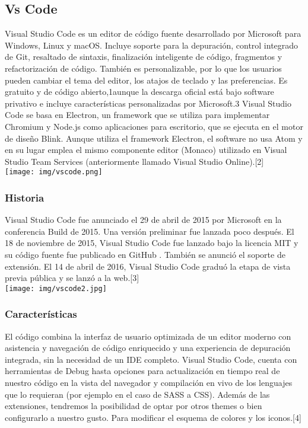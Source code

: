 \documentclass[twocolumn]{article}
\begin{document}
\subsection{Vs Code}
Visual Studio Code es un editor de código fuente desarrollado por Microsoft para Windows, Linux 
y macOS. Incluye soporte para la depuración, control integrado de Git, resaltado de sintaxis, 
finalización inteligente de código, fragmentos y refactorización de código. También es personalizable, 
por lo que los usuarios pueden cambiar el tema del editor, los atajos de teclado y las preferencias. Es 
gratuito y de código abierto,1aunque la descarga oficial está bajo software privativo e incluye características 
personalizadas por Microsoft.3
Visual Studio Code se basa en Electron, un framework que se utiliza para implementar Chromium y Node.js como 
aplicaciones para escritorio, que se ejecuta en el motor de diseño Blink. Aunque utiliza el framework Electron, 
el software no usa Atom y en su lugar emplea el mismo componente editor (Monaco) utilizado en Visual Studio Team 
Services (anteriormente llamado Visual Studio Online).[2]\\
\texttt{[image: img/vscode.png]}
\subsubsection{Historia}

Visual Studio Code fue anunciado el 29 de abril de 2015 por Microsoft en la conferencia Build de 2015. 
Una versión preliminar fue lanzada poco después. El 18 de noviembre de 2015, Visual Studio Code fue lanzado 
bajo la licencia MIT y su código fuente fue publicado en GitHub . También se anunció el soporte de extensión. 
El 14 de abril de 2016, Visual Studio Code graduó la etapa de vista previa pública y se lanzó a la web.[3]\\
\texttt{[image: img/vscode2.jpg]}

\subsubsection{Características}

El código combina la interfaz de usuario optimizada de un editor moderno con asistencia y navegación de código 
enriquecido y una experiencia de depuración integrada, sin la necesidad de un IDE completo. Visual Studio Code, 
cuenta con herramientas de Debug hasta opciones para actualización en tiempo real de nuestro código en la vista 
del navegador y compilación en vivo de los lenguajes que lo requieran (por ejemplo en el caso de SASS a CSS). Además 
de las extensiones, tendremos la posibilidad de optar por otros themes o bien configurarlo a nuestro gusto. Para 
modificar el esquema de colores y los iconos.[4]\\
\end{document}

